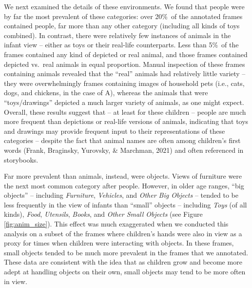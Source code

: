 \documentclass[10pt, letterpaper]{article}
\begin{document}
We next examined the details of these environments. We found that people
were by far the most prevalent of these categories: over 20\%~of the
annotated frames contained people, far more than any other category
(including all kinds of toys combined). In contrast, there were
relatively few instances of animals in the infant view -- either as toys
or their real-life counterparts. Less than 5\%~of the frames contained
any kind of depicted or real animal, and those frames contained depicted
vs.~real animals in equal proportion. Manual inspection of these frames
containing animals revealed that the ``real'' animals had relatively
little variety -- they were overwhelmingly frames containing images of
household pets (i.e., cats, dogs, and chickens, in the case of A),
whereas the animals that were ``toys/drawings'' depicted a much larger
variety of animals, as one might expect. Overall, these results suggest
that -- at least for these children -- people are much more frequent
than depictions or real-life versions of animals, indicating that toys
and drawings may provide frequent input to their representations of
these categories -- despite the fact that animal names are often among
children's first words (Frank, Braginsky, Yurovsky, \& Marchman, 2021)
and often referenced in storybooks.

Far more prevalent than animals, instead, were objects. Views of
furniture were the next most common category after people. However, in
older age ranges, ``big objects'' -- including \emph{Furniture},
\emph{Vehicles}, and \emph{Other Big Objects} -- tended to be less
frequently in the view of infants than ``small'' objects -- including
\emph{Toys} (of all kinds), \emph{Food}, \emph{Utensils}, \emph{Books},
and \emph{Other Small Objects} (see Figure \ref{fig:anim_size}). This
effect was much exaggerated when we conducted this analysis on a subset
of the frames where children's hands were also in view as a proxy for
times when children were interacting with objects. In these frames,
small objects tended to be much more prevalent in the frames that we
annotated. These data are consistent with the idea that as children grow
and become more adept at handling objects on their own, small objects
may tend to be more often in view.
\end{document}
